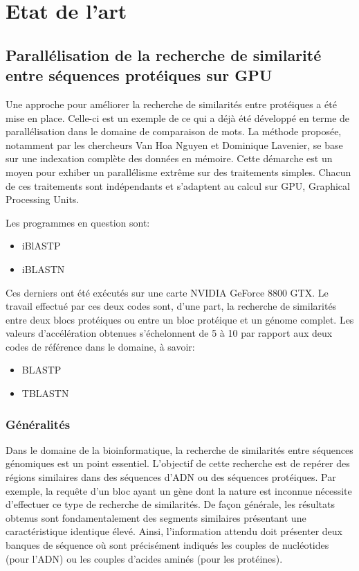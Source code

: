 \section{Etat de l'art}

\subsection{Parallélisation de la recherche de similarité entre
séquences protéiques sur GPU}

Une approche pour améliorer la recherche de similarités
entre protéiques a été mise en place.
Celle-ci est un exemple de ce qui a déjà été développé
en terme de parallélisation dans le domaine de
comparaison de mots.
La méthode proposée, notamment par les chercheurs
Van Hoa Nguyen et Dominique Lavenier,
se base sur une indexation complète des données en mémoire.
Cette démarche est un moyen pour exhiber un parallélisme
extrême sur des traitements simples.
Chacun de ces traitements sont indépendants et s'adaptent
au calcul sur GPU, Graphical Processing Units.

Les programmes en question sont:

\begin{itemize}
\item iBlASTP
\item iBLASTN
\end{itemize}

Ces derniers ont été exécutés sur une carte
NVIDIA GeForce 8800 GTX.
Le travail effectué par ces deux codes sont, d'une part,
la recherche de similarités entre deux blocs protéiques
ou entre un bloc protéique et un génome complet.
Les valeurs d'accélération obtenues s'échelonnent
de 5 à 10 par rapport aux deux codes de référence
dans le domaine, à savoir:

\begin{itemize}
\item BLASTP
\item TBLASTN
\end{itemize}

\subsubsection{Généralités}

Dans le domaine de la bioinformatique, la recherche de
similarités entre séquences génomiques est un point
essentiel. L'objectif de cette recherche est de repérer
des régions similaires dans des séquences d'ADN ou des
séquences protéiques. Par exemple, la requête d'un bloc
ayant un gène dont la nature est inconnue nécessite
d'effectuer ce type de recherche de similarités.
De façon générale, les résultats obtenus sont
fondamentalement des segments similaires présentant
une caractéristique identique élevé. Ainsi,
l'information attendu doit présenter deux banques
de séquence où sont précisément indiqués les couples
de nucléotides (pour l'ADN) ou les couples d'acides
aminés (pour les protéines).

